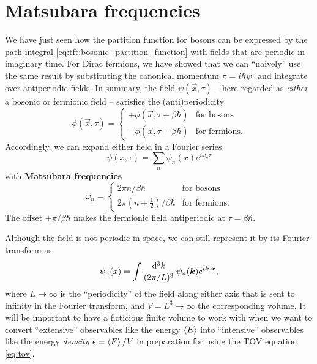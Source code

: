 \section{Matsubara frequencies}

We have just seen how the partition function for bosons can be expressed by the path integral \eqref{eq:tft:bosonic_partition_function} with fields that are periodic in imaginary time.
For Dirac fermions, we have showed that we can ``naively'' use the same result by substituting the canonical momentum $\pi = i \hbar \psi^\dagger$ and integrate over antiperiodic fields.
In summary, the field $\psi(\vec{x}, \tau)$ -- here regarded as \emph{either} a bosonic or fermionic field -- satisfies the (anti)periodicity
\begin{equation}
	\phi(\vec{x}, \tau) = \begin{cases}
						      + \phi(\vec{x}, \tau + \beta \hbar) & \text{for bosons} \\
						      - \phi(\vec{x}, \tau + \beta \hbar) & \text{for fermions} .
	                      \end{cases}
\label{eq:tft:periodicity}
\end{equation}
Accordingly, we can expand either field in a Fourier series
\begin{equation}
	\psi(x, \tau) = \sum_n \psi_n(x) e^{i \omega_n \tau}
\end{equation}
with \textbf{Matsubara frequencies} 
\begin{equation}
	\omega_n = \begin{cases}
			       2 \pi n / \beta \hbar    & \text{for bosons} \\
				   2 \pi (n+\frac12) / \beta \hbar & \text{for fermions} .
	           \end{cases}
\label{eq:tft:matsubara_frequencies}
\end{equation}
The offset $+\pi / \beta \hbar$ makes the fermionic field antiperiodic at $\tau = \beta \hbar$.

Although the field is not periodic in space, we can still represent it by its Fourier transform as
\begin{equation}
	\psi_n(x) = \int \frac{\mathop{}\!\mathrm{d}^3 k}{(2 \pi / L)^3} \, \psi_n({\bm{k}}) e^{i {\bm{k}} \cdot {\bm{x}}},
\label{eq:tft:mathematical_fourier_expansion}
\end{equation}
where $L \rightarrow \infty$ is the ``periodicity'' of the field along either axis that is sent to infinity in the Fourier transform, and $V = L^3 \rightarrow \infty$ the corresponding volume.
It will be important to have a ficticious finite volume to work with when we want to convert ``extensive'' observables like the energy $\left< E \right>$ into ``intensive'' observables like the energy \emph{density} $\epsilon = \left< E \right> / V$ in preparation for using the TOV equation \eqref{eq:tov}.

